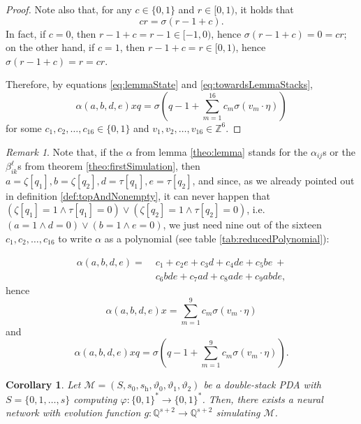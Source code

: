 \documentclass{book}
\newcommand{\Q}{\mathbb{Q}}
\newcommand{\h}{\mathrm{h}}
\theoremstyle{definition}
\theoremstyle{plain}
\newcounter{theoremCounter}
\theoremstyle{plain}
\theoremstyle{remark}
\newtheorem{remark}{Remark}[theorem]
\theoremstyle{plain}
\newtheorem{corollary}{Corollary}[theorem]
\begin{document}
\begin{proof}
		Note also that, for any $c\in\{0,1\}$ and $r\in[0,1)$, it holds that 
		\begin{equation} \label{eq:towardsLemmaStacks}
			cr=\sigma(r-1+c).
		\end{equation}
		In fact, if $c=0$, then $r-1+c=r-1\in[-1,0)$, hence $\sigma(r-1+c)=0=cr$; on the other hand, if $c=1$, then $r-1+c=r\in[0,1)$, hence $\sigma(r-1+c)=r=cr$.
		
		Therefore, by equations \ref{eq:lemmaState} and \ref{eq:towardsLemmaStacks},
		$$
			\alpha(a,b,d,e)xq=\sigma\!\left(q-1+\sum_{m=1}^{16}c_m\sigma(v_m\cdot\eta)\right)
		$$
		for some $c_1,c_2,\dots,c_{16}\in\{0,1\}$ and $v_1,v_2,\dots,v_{16}\in\mathbb{Z}^6$.
	\end{proof}
	
	\begin{remark} \label{theo:9not16}
		Note that, if the $\alpha$ from lemma \ref{theo:lemma} stands for the $\alpha_{ij}$s or the $\beta_{ik}^\ell$s from theorem \ref{theo:firstSimulation}, then $a=\zeta[q_1],b=\zeta[q_2],d=\tau[q_1],e=\tau[q_2]$, and since, as we already pointed out in definition \ref{def:topAndNonempty}, it can never happen that $(\zeta[q_1]=1\land\tau[q_1]=0)\lor(\zeta[q_2]=1\land\tau[q_2]=0)$, i.e. $(a=1\land d=0)\lor(b=1\land e=0)$, we just need nine out of the sixteen $c_1,c_2,\dots,c_{16}$ to write $\alpha$ as a polynomial (see table \ref{tab:reducedPolynomial}):
		
		\begin{align*}
			\alpha(a,b,d,e)=\;&c_1+c_2e+c_3d+c_4de+c_5be\:+ \\
							  &c_6bde+c_7ad+c_8ade+c_9abde,
		\end{align*}
		hence
		\begin{equation}
			\alpha(a,b,d,e)x=\sum_{m=1}^{9}c_m\sigma(v_m\cdot\eta) \label{eq:reducedLemmaState}
		\end{equation}
		and
		$$
			\alpha(a,b,d,e)xq=\sigma\!\left(q-1+\sum_{m=1}^{9}c_m\sigma(v_m\cdot\eta)\right).
		$$
	\end{remark}
	
	\setcounter{theorem}{\thetheoremCounter}
	\begin{corollary} \label{theo:secondSimulation}
		Let $\mathcal{M}=(S,s_0,s_\h,\vartheta_0,\vartheta_1,\vartheta_2)$ be a double-stack PDA with $S=\{0,1,\dots,s\}$ computing $\varphi:\{0,1\}^*\to\{0,1\}^*$. Then, there exists a neural network with evolution function $g:\Q^{s+2}\to\Q^{s+2}$ simulating $\mathcal{M}$.
	\end{corollary}
	
\end{document}
